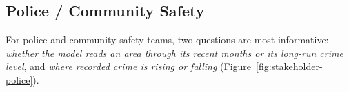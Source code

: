 \subsection{Police / Community Safety}
For police and community safety teams, two questions are most informative: \emph{whether the
model reads an area through its recent months or its long-run crime level}, and \emph{where
recorded crime is rising or falling} (Figure~\ref{fig:stakeholder-police}).\par\medskip
%


